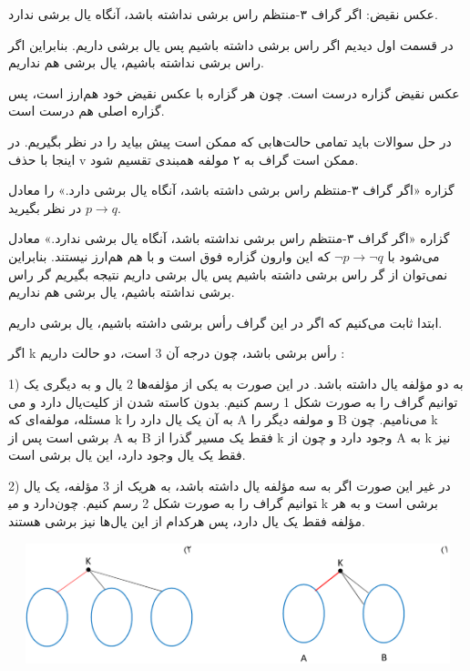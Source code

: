 \documentclass[11pt,largemargins]{h2wp}
\begin{document}
 عکس نقیض: اگر گراف ۳-منتظم راس برشی نداشته باشد، آنگاه یال برشی ندارد.
 
 در قسمت اول دیدیم اگر راس برشی داشته باشیم پس یال برشی داریم. بنابراین اگر راس برشی نداشته باشیم، یال برشی هم نداریم.
 
 عکس نقیض گزاره درست است. چون هر گزاره با عکس نقیض خود هم‌ارز است، پس گزاره اصلی هم درست است.
 
 \notes
 
 در حل سوالات باید تمامی حالت‌هابی که ممکن است پیش بیاید را در نظر بگیریم. در اینجا با حذف v ممکن است گراف به ۲ مولفه همبندی تقسیم شود.
 
 
 گزاره «اگر گراف ۳-منتظم راس برشی داشته باشد، آنگاه یال برشی دارد.» را معادل $p \rightarrow q $ در نظر بگیرید.
 
 گزاره «اگر گراف ۳-منتظم راس برشی نداشته باشد، آنگاه یال برشی ندارد.» معادل می‌شود با
  $ \neg p \rightarrow \neg q $ 
 که این وارون گزاره فوق است و با هم هم‌ارز نیستند.
 بنابراین نمی‌توان از گر راس برشی داشته باشیم پس یال برشی داریم نتیجه بگیریم گر راس برشی نداشته باشیم، یال برشی هم نداریم. 
 
    ابتدا ثابت می‌کنیم که اگر در این گراف رأس برشی داشته باشیم، یال برشی داریم.
    
    اگر k رأس برشی باشد، چون درجه آن 3 است، دو حالت داریم : 
    
    1)	به دو مؤلفه یال داشته باشد. در این صورت به یکی از مؤلفه‌ها 2 یال و به دیگری یک یال دارد و می‎‌توانیم گراف را به صورت شکل 1 رسم کنیم. بدون کاسته شدن از کلیت مسئله، مولفه‌ای که k به آن یک یال دارد را A و مولفه دیگر را B می‌نامیم. چون k برشی است پس از A به B فقط یک مسیر گذرا از k وجود دارد و چون از A به k نیز فقط یک یال وجود دارد، این یال برشی است.
    
    2)	در غیر این صورت اگر به سه مؤلفه یال داشته باشد، به هریک از 3 مؤلفه، یک یال دارد و می‎توانیم گراف را به صورت شکل 2 رسم کنیم. چون k برشی است و به هر مؤلفه فقط یک یال دارد، پس هرکدام از این یال‌ها نیز برشی هستند. 
    
    
    
    \includegraphics[width=15cm, height=3.5cm]{1.png}
   
\end{document}
